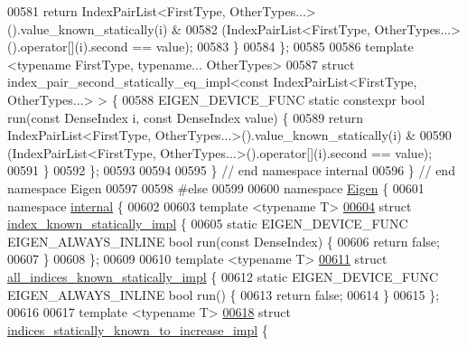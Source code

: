 \begin{DoxyCode}
00581     \textcolor{keywordflow}{return} IndexPairList<FirstType, OtherTypes...>().value\_known\_statically(i) &
00582         (IndexPairList<FirstType, OtherTypes...>().\textcolor{keyword}{operator}[](i).second == value);
00583   \}
00584 \};
00585 
00586 \textcolor{keyword}{template} <\textcolor{keyword}{typename} FirstType, \textcolor{keyword}{typename}... OtherTypes>
00587 \textcolor{keyword}{struct }index\_pair\_second\_statically\_eq\_impl<const IndexPairList<FirstType, OtherTypes...> > \{
00588   EIGEN\_DEVICE\_FUNC \textcolor{keyword}{static} constexpr \textcolor{keywordtype}{bool} run(\textcolor{keyword}{const} DenseIndex i, \textcolor{keyword}{const} DenseIndex value) \{
00589     \textcolor{keywordflow}{return} IndexPairList<FirstType, OtherTypes...>().value\_known\_statically(i) &
00590         (IndexPairList<FirstType, OtherTypes...>().\textcolor{keyword}{operator}[](i).second == value);
00591   \}
00592 \};
00593 
00594 
00595 \}  \textcolor{comment}{// end namespace internal}
00596 \}  \textcolor{comment}{// end namespace Eigen}
00597 
00598 \textcolor{preprocessor}{#else}
00599 
00600 \textcolor{keyword}{namespace }\hyperlink{namespace_eigen}{Eigen} \{
00601 \textcolor{keyword}{namespace }\hyperlink{namespaceinternal}{internal} \{
00602 
00603 \textcolor{keyword}{template} <\textcolor{keyword}{typename} T>
\hyperlink{struct_eigen_1_1internal_1_1index__known__statically__impl}{00604} \textcolor{keyword}{struct }\hyperlink{struct_eigen_1_1internal_1_1index__known__statically__impl}{index\_known\_statically\_impl} \{
00605   \textcolor{keyword}{static} EIGEN\_DEVICE\_FUNC EIGEN\_ALWAYS\_INLINE \textcolor{keywordtype}{bool} run(\textcolor{keyword}{const} DenseIndex) \{
00606     \textcolor{keywordflow}{return} \textcolor{keyword}{false};
00607   \}
00608 \};
00609 
00610 \textcolor{keyword}{template} <\textcolor{keyword}{typename} T>
\hyperlink{struct_eigen_1_1internal_1_1all__indices__known__statically__impl}{00611} \textcolor{keyword}{struct }\hyperlink{struct_eigen_1_1internal_1_1all__indices__known__statically__impl}{all\_indices\_known\_statically\_impl} \{
00612   \textcolor{keyword}{static} EIGEN\_DEVICE\_FUNC EIGEN\_ALWAYS\_INLINE \textcolor{keywordtype}{bool} run() \{
00613     \textcolor{keywordflow}{return} \textcolor{keyword}{false};
00614   \}
00615 \};
00616 
00617 \textcolor{keyword}{template} <\textcolor{keyword}{typename} T>
\hyperlink{struct_eigen_1_1internal_1_1indices__statically__known__to__increase__impl}{00618} \textcolor{keyword}{struct }\hyperlink{struct_eigen_1_1internal_1_1indices__statically__known__to__increase__impl}{indices\_statically\_known\_to\_increase\_impl} \{

\end{DoxyCode}
